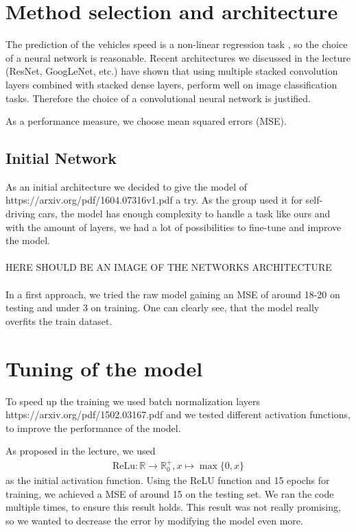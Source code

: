 \documentclass[conference]{IEEEtran}
\begin{document}
\section{Method selection and architecture}
The prediction of the vehicles speed is a non-linear regression task , so the choice of a neural network is reasonable. 
Recent architectures we discussed in the lecture (ResNet, GoogLeNet, etc.) have shown that using multiple stacked convolution layers
combined with stacked dense layers, perform well on image classification tasks. Therefore the choice of a convolutional neural 
network is justified.

As a performance measure, we choose mean squared errors (MSE).

\subsection{Initial Network}

As an initial architecture we decided to give the model of https://arxiv.org/pdf/1604.07316v1.pdf a try. As the group used it
for self-driving cars, the model has enough complexity to handle a task like ours and with the amount of layers, we had a lot of
possibilities to fine-tune and improve the model.\\
\\HERE SHOULD BE AN IMAGE OF THE NETWORKS ARCHITECTURE\\
\\In a first approach, we tried the raw model gaining an MSE of around 18-20 on testing and under 3 on training. One can clearly 
see, that the model really overfits the train dataset.

\section{Tuning of the model}
To speed up the training we used batch normalization layers https://arxiv.org/pdf/1502.03167.pdf and we tested different activation functions, to improve the performance of the model. 

As proposed in the lecture, we used
\begin{align*}
\mathrm{ReLu}: \mathbb{R} \to \mathbb{R}_0^+, x \mapsto \max\{0,x\}
\end{align*}
as the initial activation function. Using the ReLU function and 15 epochs for training, we achieved a MSE of around 15 on the 
testing set. We ran the 
code multiple times, to ensure this result holds. This result was not really promising, so we wanted to decrease the error by 
modifying the model even more.
\end{document}
